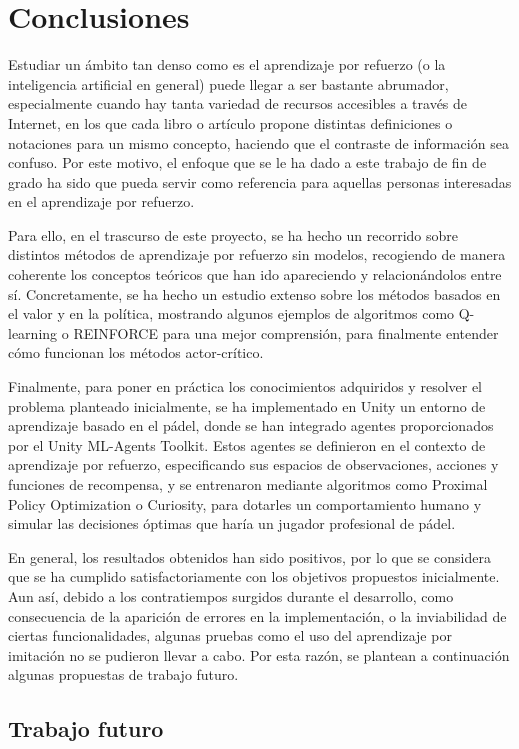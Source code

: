 \chapter{Conclusiones}

Estudiar un ámbito tan denso como es el aprendizaje por refuerzo (o la inteligencia artificial en general) puede llegar a ser bastante abrumador, especialmente cuando hay tanta variedad de recursos accesibles a través de Internet, en los que cada libro o artículo propone distintas definiciones o notaciones para un mismo concepto, haciendo que el contraste de información sea confuso. Por este motivo, el enfoque que se le ha dado a este trabajo de fin de grado ha sido que pueda servir como referencia para aquellas personas interesadas en el aprendizaje por refuerzo.

Para ello, en el trascurso de este proyecto, se ha hecho un recorrido sobre distintos métodos de aprendizaje por refuerzo sin modelos, recogiendo de manera coherente los conceptos teóricos que han ido apareciendo y relacionándolos entre sí. Concretamente, se ha hecho un estudio extenso sobre los métodos basados en el valor y en la política, mostrando algunos ejemplos de algoritmos como Q-learning o REINFORCE para una mejor comprensión, para finalmente entender cómo funcionan los métodos actor-crítico.

Finalmente, para poner en práctica los conocimientos adquiridos y resolver el problema planteado inicialmente, se ha implementado en Unity un entorno de aprendizaje basado en el pádel, donde se han integrado agentes proporcionados por el Unity ML-Agents Toolkit. Estos agentes se definieron en el contexto de aprendizaje por refuerzo, especificando sus espacios de observaciones, acciones y funciones de recompensa, y se entrenaron mediante algoritmos como Proximal Policy Optimization o Curiosity, para dotarles un comportamiento humano y simular las decisiones óptimas que haría un jugador profesional de pádel.

En general, los resultados obtenidos han sido positivos, por lo que se considera que se ha cumplido satisfactoriamente con los objetivos propuestos inicialmente. Aun así, debido a los contratiempos surgidos durante el desarrollo, como consecuencia de la aparición de errores en la implementación, o la inviabilidad de ciertas funcionalidades, algunas pruebas como el uso del aprendizaje por imitación no se pudieron llevar a cabo. Por esta razón, se plantean a continuación algunas propuestas de trabajo futuro.

\section{Trabajo futuro}

